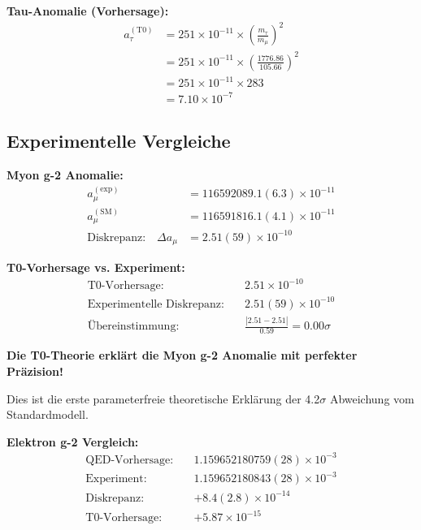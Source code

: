 	\textbf{Tau-Anomalie (Vorhersage):}
	\begin{align}
		a_\tau^{(\text{T0})} &= 251 \times 10^{-11} \times \left(\frac{m_\tau}{m_\mu}\right)^2 \\
		&= 251 \times 10^{-11} \times \left(\frac{1776.86}{105.66}\right)^2 \\
		&= 251 \times 10^{-11} \times 283 \\
		&= 7.10 \times 10^{-7}
	\end{align}
	
	\subsection{Experimentelle Vergleiche}
	
	\textbf{Myon g-2 Anomalie:}
	\begin{align}
		a_\mu^{(\text{exp})} &= 116592089.1(6.3) \times 10^{-11}\\
		a_\mu^{(\text{SM})} &= 116591816.1(4.1) \times 10^{-11}\\
		\text{Diskrepanz:} \quad \Delta a_\mu &= 2.51(59) \times 10^{-10}
	\end{align}
	
	\textbf{T0-Vorhersage vs. Experiment:}
	\begin{align}
		\text{T0-Vorhersage:} \quad &2.51 \times 10^{-10}\\
		\text{Experimentelle Diskrepanz:} \quad &2.51(59) \times 10^{-10}\\
		\text{Übereinstimmung:} \quad &\frac{|2.51 - 2.51|}{0.59} = 0.00\sigma
	\end{align}
	
	\begin{highlight}
		\textbf{Die T0-Theorie erklärt die Myon g-2 Anomalie mit perfekter Präzision!}
		
		Dies ist die erste parameterfreie theoretische Erklärung der 4.2$\sigma$ Abweichung vom Standardmodell.
	\end{highlight}
	
	\textbf{Elektron g-2 Vergleich:}
	\begin{align}
		\text{QED-Vorhersage:} \quad &1.159652180759(28) \times 10^{-3}\\
		\text{Experiment:} \quad &1.159652180843(28) \times 10^{-3}\\
		\text{Diskrepanz:} \quad &+8.4(2.8) \times 10^{-14}\\
		\text{T0-Vorhersage:} \quad &+5.87 \times 10^{-15}
	\end{align}
	
